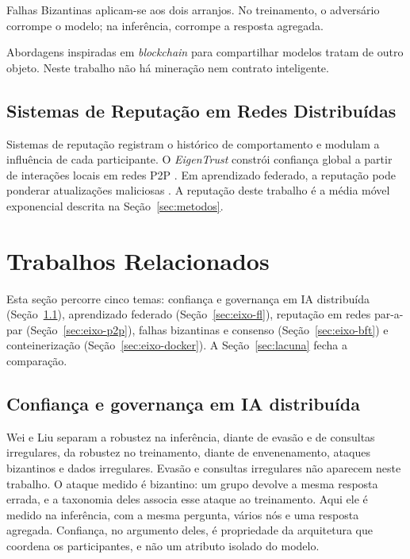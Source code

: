 \documentclass[12pt]{article}
\begin{document}
Falhas Bizantinas \cite{lamport1982,castro1999} aplicam-se aos dois arranjos. No treinamento, o adversário corrompe o modelo; na inferência, corrompe a resposta agregada.

Abordagens inspiradas em \textit{blockchain} para compartilhar modelos \cite{chen2024} tratam de outro objeto. Neste trabalho não há mineração nem contrato inteligente.

\subsection{Sistemas de Reputação em Redes Distribuídas}

Sistemas de reputação registram o histórico de comportamento e modulam a influência de cada participante. O \textit{EigenTrust} constrói confiança global a partir de interações locais em redes P2P \cite{kamvar2003}. Em aprendizado federado, a reputação pode ponderar atualizações maliciosas \cite{chen2024}. A reputação deste trabalho é a média móvel exponencial descrita na Seção~\ref{sec:metodos}.

\section{Trabalhos Relacionados}
\label{sec:relacionados}

Esta seção percorre cinco temas: confiança e governança em IA distribuída (Seção~\ref{sec:eixo-ia}), aprendizado federado (Seção~\ref{sec:eixo-fl}), reputação em redes par-a-par (Seção~\ref{sec:eixo-p2p}), falhas bizantinas e consenso (Seção~\ref{sec:eixo-bft}) e conteinerização (Seção~\ref{sec:eixo-docker}). A Seção~\ref{sec:lacuna} fecha a comparação.

\subsection{Confiança e governança em IA distribuída}
\label{sec:eixo-ia}

Wei e Liu \cite{wei2025} separam a robustez na inferência, diante de evasão e de consultas irregulares, da robustez no treinamento, diante de envenenamento, ataques bizantinos e dados irregulares. Evasão e consultas irregulares não aparecem neste trabalho. O ataque medido é bizantino: um grupo devolve a mesma resposta errada, e a taxonomia deles associa esse ataque ao treinamento. Aqui ele é medido na inferência, com a mesma pergunta, vários nós e uma resposta agregada. Confiança, no argumento deles, é propriedade da arquitetura que coordena os participantes, e não um atributo isolado do modelo.
\end{document}
